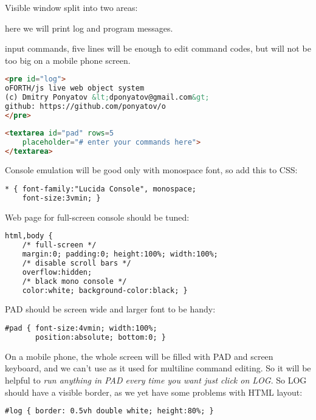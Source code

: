 \pg Visible window split into two areas:
\begin{description}[nosep]
\item[log] here we will print log and program messages.
\item[pad] input commands, five lines will be enough to edit command codes, but
will not be too big on a mobile phone screen.
\end{description}
\begin{lstlisting}[language=html]
<pre id="log">
oFORTH/js live web object system
(c) Dmitry Ponyatov &lt;dponyatov@gmail.com&gt;
github: https://github.com/ponyatov/o
</pre>
\end{lstlisting}
\begin{lstlisting}[language=html]
<textarea id="pad" rows=5
	placeholder="# enter your commands here">
</textarea>
\end{lstlisting}

\pg Console emulation will be good only with monospace font, so add this to CSS:

\begin{lstlisting}[language=html]
* { font-family:"Lucida Console", monospace;
    font-size:3vmin; }
\end{lstlisting}

\noindent
Web page for full-screen console should be tuned:
\begin{lstlisting}[language=html]
html,body {
	/* full-screen */
	margin:0; padding:0; height:100%; width:100%;
	/* disable scroll bars */
	overflow:hidden;
	/* black mono console */
	color:white; background-color:black; }
\end{lstlisting}

\pg PAD should be screen wide and larger font to be handy:
\begin{lstlisting}[language=html]
#pad { font-size:4vmin; width:100%;
       position:absolute; bottom:0; }
\end{lstlisting}

\noindent
On a mobile phone, the whole screen will be filled with PAD and screen keyboard,
and we can't use  as it used for multiline command editing. So it
will be helpful to \emph{run anything in PAD every time you want just click on
LOG}. So LOG should have a visible border, as we yet have some problems with
HTML layout:
\begin{lstlisting}[language=html]
#log { border: 0.5vh double white; height:80%; }
\end{lstlisting}

